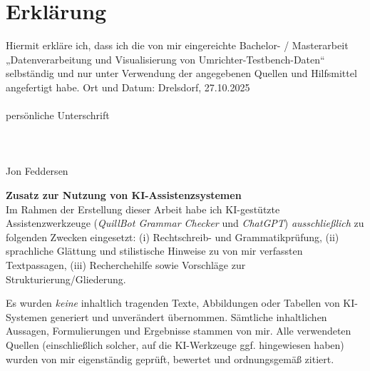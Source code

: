 \newpage
\section{Erklärung}
\label{sec:erklarung}
\label{sec:erklärung}

Hiermit erkläre ich, dass ich die von mir eingereichte Bachelor- / Masterarbeit
„Datenverarbeitung und Visualisierung von Umrichter-Testbench-Daten“ selbständig und nur unter Verwendung der
angegebenen Quellen und Hilfsmittel angefertigt habe.
Ort und Datum: Drelsdorf, 27.10.2025
\\
\\
persönliche Unterschrift
\\
\\
\\
\\
Jon Feddersen


\medskip
\noindent\textbf{Zusatz zur Nutzung von KI-Assistenzsystemen}\\
Im Rahmen der Erstellung dieser Arbeit habe ich KI-gestützte Assistenzwerkzeuge
(\emph{QuillBot Grammar Checker} und \emph{ChatGPT})
\emph{ausschließlich} zu folgenden Zwecken eingesetzt:
(i) Rechtschreib- und Grammatikprüfung,
(ii) sprachliche Glättung und stilistische Hinweise zu von mir verfassten Textpassagen,
(iii) Recherchehilfe sowie Vorschläge zur Strukturierung/Gliederung.

Es wurden \emph{keine} inhaltlich tragenden Texte, Abbildungen oder Tabellen von KI-Systemen generiert und unverändert übernommen. Sämtliche inhaltlichen Aussagen, Formulierungen und Ergebnisse stammen von mir.
Alle verwendeten Quellen (einschließlich solcher, auf die KI-Werkzeuge ggf. hingewiesen haben) wurden von mir eigenständig geprüft, bewertet und ordnungsgemäß zitiert.
